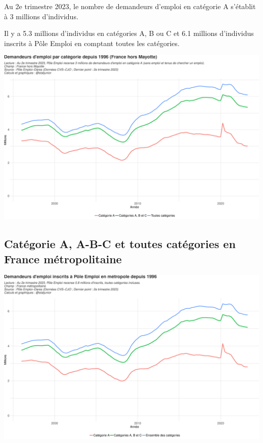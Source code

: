 \documentclass[
  paper=a4,
  ,captions=tableheading
]{scrartcl}
\begin{document}
Au 2e trimestre 2023, le nombre de demandeurs d'emploi en catégorie A
s'établit à 3 millions d'individus.

Il y a 5.3 millions d'individus en catégories A, B ou C et 6.1 millions
d'individus inscrits à Pôle Emploi en comptant toutes les catégories.

\includegraphics{rapport_pdf_demandeurs_emploi_pole_emploi_files/figure-latex/unnamed-chunk-2-1.pdf}

\hypertarget{catuxe9gorie-a-a-b-c-et-toutes-catuxe9gories-en-france-muxe9tropolitaine}{%
\subsection{Catégorie A, A-B-C et toutes catégories en France
métropolitaine}\label{catuxe9gorie-a-a-b-c-et-toutes-catuxe9gories-en-france-muxe9tropolitaine}}

\includegraphics{rapport_pdf_demandeurs_emploi_pole_emploi_files/figure-latex/unnamed-chunk-3-1.pdf}
\end{document}
